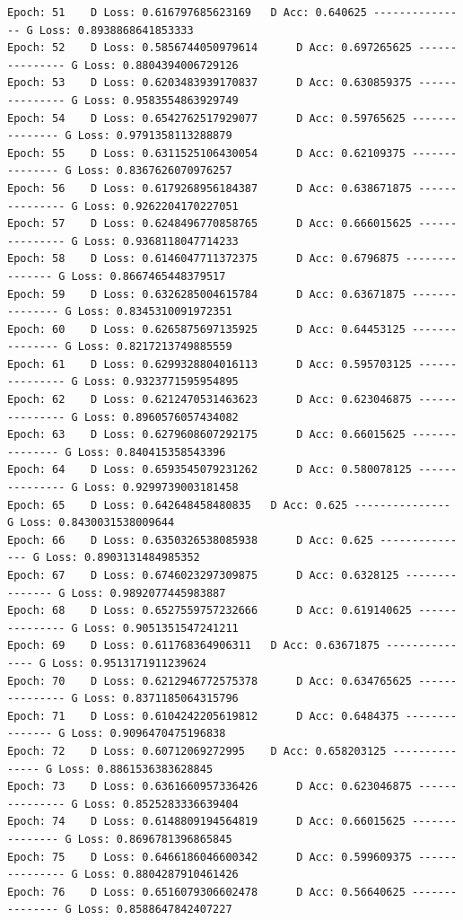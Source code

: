 \documentclass[11pt]{article}
\begin{document}
\begin{Verbatim}[commandchars=\\\{\}]
Epoch: 51 	 D Loss: 0.616797685623169 	 D Acc: 0.640625 --------------- G Loss: 0.8938868641853333
Epoch: 52 	 D Loss: 0.5856744050979614 	 D Acc: 0.697265625 --------------- G Loss: 0.8804394006729126
Epoch: 53 	 D Loss: 0.6203483939170837 	 D Acc: 0.630859375 --------------- G Loss: 0.9583554863929749
Epoch: 54 	 D Loss: 0.6542762517929077 	 D Acc: 0.59765625 --------------- G Loss: 0.9791358113288879
Epoch: 55 	 D Loss: 0.6311525106430054 	 D Acc: 0.62109375 --------------- G Loss: 0.8367626070976257
Epoch: 56 	 D Loss: 0.6179268956184387 	 D Acc: 0.638671875 --------------- G Loss: 0.9262204170227051
Epoch: 57 	 D Loss: 0.6248496770858765 	 D Acc: 0.666015625 --------------- G Loss: 0.9368118047714233
Epoch: 58 	 D Loss: 0.6146047711372375 	 D Acc: 0.6796875 --------------- G Loss: 0.8667465448379517
Epoch: 59 	 D Loss: 0.6326285004615784 	 D Acc: 0.63671875 --------------- G Loss: 0.8345310091972351
Epoch: 60 	 D Loss: 0.6265875697135925 	 D Acc: 0.64453125 --------------- G Loss: 0.8217213749885559
Epoch: 61 	 D Loss: 0.6299328804016113 	 D Acc: 0.595703125 --------------- G Loss: 0.9323771595954895
Epoch: 62 	 D Loss: 0.6212470531463623 	 D Acc: 0.623046875 --------------- G Loss: 0.8960576057434082
Epoch: 63 	 D Loss: 0.6279608607292175 	 D Acc: 0.66015625 --------------- G Loss: 0.840415358543396
Epoch: 64 	 D Loss: 0.6593545079231262 	 D Acc: 0.580078125 --------------- G Loss: 0.9299739003181458
Epoch: 65 	 D Loss: 0.642648458480835 	 D Acc: 0.625 --------------- G Loss: 0.8430031538009644
Epoch: 66 	 D Loss: 0.6350326538085938 	 D Acc: 0.625 --------------- G Loss: 0.8903131484985352
Epoch: 67 	 D Loss: 0.6746023297309875 	 D Acc: 0.6328125 --------------- G Loss: 0.9892077445983887
Epoch: 68 	 D Loss: 0.6527559757232666 	 D Acc: 0.619140625 --------------- G Loss: 0.9051351547241211
Epoch: 69 	 D Loss: 0.611768364906311 	 D Acc: 0.63671875 --------------- G Loss: 0.9513171911239624
Epoch: 70 	 D Loss: 0.6212946772575378 	 D Acc: 0.634765625 --------------- G Loss: 0.8371185064315796
Epoch: 71 	 D Loss: 0.6104242205619812 	 D Acc: 0.6484375 --------------- G Loss: 0.9096470475196838
Epoch: 72 	 D Loss: 0.60712069272995 	 D Acc: 0.658203125 --------------- G Loss: 0.8861536383628845
Epoch: 73 	 D Loss: 0.6361660957336426 	 D Acc: 0.623046875 --------------- G Loss: 0.8525283336639404
Epoch: 74 	 D Loss: 0.6148809194564819 	 D Acc: 0.66015625 --------------- G Loss: 0.8696781396865845
Epoch: 75 	 D Loss: 0.6466186046600342 	 D Acc: 0.599609375 --------------- G Loss: 0.8804287910461426
Epoch: 76 	 D Loss: 0.6516079306602478 	 D Acc: 0.56640625 --------------- G Loss: 0.8588647842407227

\end{Verbatim}
\end{document}
